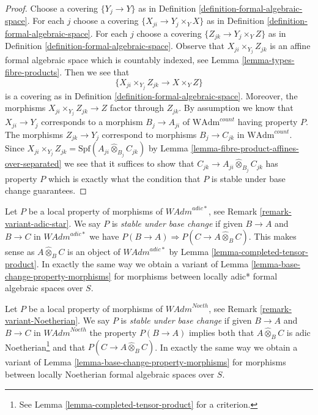 \begin{proof}
Choose a covering $\{Y_j \to Y\}$ as in
Definition \ref{definition-formal-algebraic-space}.
For each $j$ choose a covering $\{X_{ji} \to Y_j \times_Y X\}$
as in Definition \ref{definition-formal-algebraic-space}.
For each $j$ choose a covering $\{Z_{jk} \to Y_j \times_Y Z\}$
as in Definition \ref{definition-formal-algebraic-space}.
Observe that $X_{ji} \times_{Y_j} Z_{jk}$ is an
affine formal algebraic space which is countably indexed, see
Lemma \ref{lemma-types-fibre-products}.
Then we see that
$$
\{X_{ji} \times_{Y_j} Z_{jk} \to X \times_Y Z\}
$$
is a covering as in Definition \ref{definition-formal-algebraic-space}.
Moreover, the morphisms $X_{ji} \times_{Y_j} Z_{jk} \to Z$
factor through $Z_{jk}$. By assumption we know that
$X_{ji} \to Y_j$ corresponds to a morphism $B_j \to A_{ji}$ of
$\text{WAdm}^{count}$ having property $P$.
The morphisms $Z_{jk} \to Y_j$ correspond to morphisms $B_j \to C_{jk}$ in
$\text{WAdm}^{count}$. Since
$X_{ji} \times_{Y_j} Z_{jk} =
\text{Spf}(A_{ji} \widehat{\otimes}_{B_j} C_{jk})$
by Lemma \ref{lemma-fibre-product-affines-over-separated}
we see that it suffices to show that
$C_{jk} \to A_{ji} \widehat{\otimes}_{B_j} C_{jk}$
has property $P$ which is exactly what
the condition that $P$ is stable under base change guarantees.
\end{proof}

\begin{remark}
\label{remark-base-change-variant-adic-star}
Let $P$ be a local property of morphisms of $\textit{WAdm}^{adic*}$, see
Remark \ref{remark-variant-adic-star}. We say $P$ is {\it stable under
base change} if given $B \to A$ and $B \to C$ in $\textit{WAdm}^{adic*}$
we have $P(B \to A) \Rightarrow P(C \to A \widehat{\otimes}_B C)$.
This makes sense as $A \widehat{\otimes}_B C$ is an object of
$\textit{WAdm}^{adic*}$ by Lemma \ref{lemma-completed-tensor-product}.
In exactly the same way we obtain a variant of
Lemma \ref{lemma-base-change-property-morphisms}
for morphisms between locally adic* formal algebraic spaces over $S$.
\end{remark}

\begin{remark}
\label{remark-base-change-variant-Noetherian}
Let $P$ be a local property of morphisms of $\textit{WAdm}^{Noeth}$, see
Remark \ref{remark-variant-Noetherian}. We say $P$ is
{\it stable under base change} if given $B \to A$ and $B \to C$
in $\textit{WAdm}^{Noeth}$ the property $P(B \to A)$
implies both that $A \widehat{\otimes}_B C$ is adic
Noetherian\footnote{See Lemma \ref{lemma-completed-tensor-product}
for a criterion.} and that
$P(C \to A \widehat{\otimes}_B C)$.
In exactly the same way we obtain a variant of
Lemma \ref{lemma-base-change-property-morphisms}
for morphisms between locally Noetherian formal algebraic spaces over $S$.
\end{remark}

